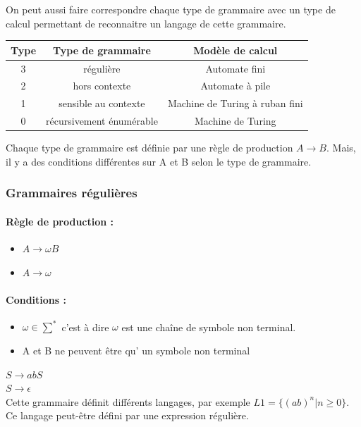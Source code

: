 On peut aussi faire correspondre chaque type de grammaire avec un type de 
calcul permettant de reconnaitre un langage de cette grammaire.

\begin{tabular}{|c|c|c|}
	\hline	
	 Type & Type de grammaire & Modèle de calcul\\
	 \hline
	3 & régulière & Automate fini \\
	2 & hors contexte & Automate à pile \\
	1 & sensible au contexte & Machine de Turing à ruban fini \\
	0 & récursivement énumérable & Machine de Turing \\
	\hline
\end{tabular}

Chaque type de grammaire est définie par une règle de production $A\rightarrow 
B$. Mais, il y a des conditions différentes sur A et B selon le type de 
grammaire.

\subsubsection{Grammaires régulières}

\paragraph{Règle de production :} 
\begin{itemize}
	\item $A \rightarrow \omega B$
	\item $A \rightarrow \omega$
\end{itemize}

\paragraph{Conditions :}

\begin{itemize}
	\item  $\omega \in \sum^*$ c'est à dire $\omega$ est une chaîne de symbole non 
	terminal. 
	\item A et B ne peuvent être qu’ un symbole non terminal
\end{itemize}

\begin{myexem}
	$S \rightarrow abS$ \\
	$S \rightarrow \epsilon$ \\
	Cette grammaire définit différents langages, par exemple $L1 = 
	\{(ab)^n|n \geq 0\}$. Ce langage peut-être défini par une expression 
	régulière.
\end{myexem}



